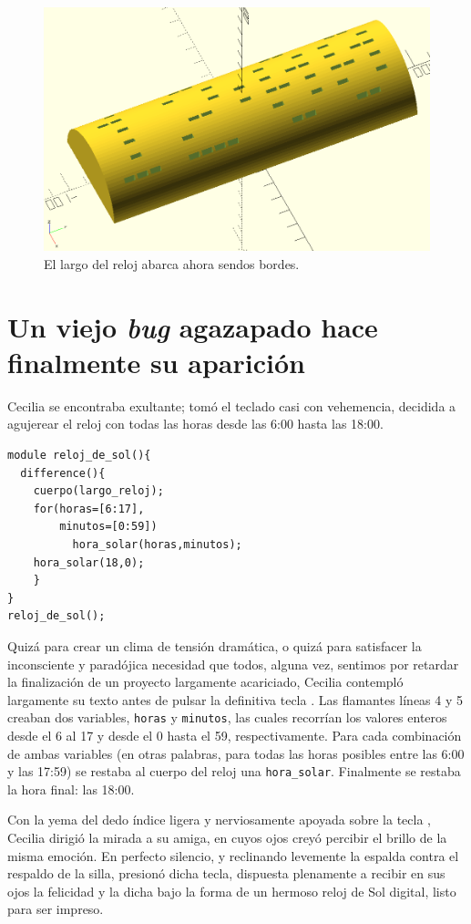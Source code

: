 \begin{figure}[ht]
  \centering
  \includegraphics[width=.7\textwidth]{imagenes/cuerpo-del-reloj-c}
  \caption{El largo del reloj abarca ahora sendos bordes.}
  \label{fig:cuerpo-del-reloj-c}
\end{figure}


\section[Un viejo \emph{bug} agazapado]{Un viejo \emph{bug} agazapado
  hace finalmente su aparición}

Cecilia se encontraba exultante; tomó el teclado casi con vehemencia,
decidida a agujerear el reloj con todas las horas desde las 6:00 hasta
las 18:00.


\begin{lstlisting}
module reloj_de_sol(){
  difference(){
    cuerpo(largo_reloj);
    for(horas=[6:17],
        minutos=[0:59])
          hora_solar(horas,minutos);
    hora_solar(18,0);
    }
}
reloj_de_sol();
\end{lstlisting}%

Quizá para crear un clima de tensión dramática, o quizá para
satisfacer la inconsciente y paradójica necesidad que todos, alguna
vez, sentimos por retardar la finalización de un proyecto largamente
acariciado, Cecilia contempló largamente su texto antes de pulsar la
definitiva tecla . Las flamantes líneas 4 y 5 creaban
dos variables, \lstinline!horas! y \lstinline!minutos!, las cuales
recorrían los valores enteros desde el 6 al 17 y desde el 0 hasta el
59, respectivamente. Para cada combinación de ambas variables (en
otras palabras, para todas las horas posibles entre las 6:00 y las
17:59) se restaba al cuerpo del reloj una
\lstinline!hora_solar!. Finalmente se restaba la hora final: las
18:00.

Con la yema del dedo índice ligera y nerviosamente apoyada sobre la
tecla , Cecilia dirigió la mirada a su amiga, en cuyos
ojos creyó percibir el brillo de la misma emoción. En perfecto
silencio, y reclinando levemente la espalda contra el respaldo de la
silla, presionó dicha tecla, dispuesta plenamente a recibir en sus
ojos la felicidad y la dicha bajo la forma de un hermoso reloj de Sol
digital, listo para ser impreso.

